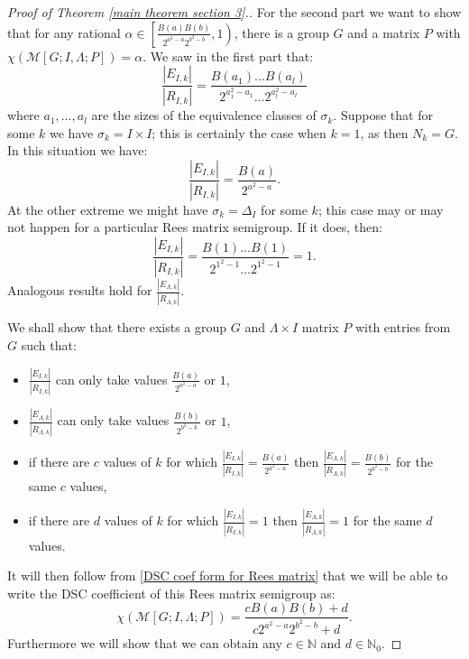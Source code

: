 \documentclass[10pt,a4paper]{amsart}
\newcommand{\N}{\mathbb{N}}
\newcommand{\RM}{\mathcal{M}[G;I,\Lambda;P]}
\begin{document}
\begin{proof}[Proof of Theorem \ref{main theorem section 3}.]
    For the second part we want to show that for any rational $\alpha \in \left[\frac{B(a)B(b)}{2^{a^2 - a}2^{b^2 - b}},1\right)$, there is a group $G$ and a matrix $P$ with $\chi(\RM) = \alpha$. 
    We saw in the first part that:
    \begin{equation*}
        \frac{|E_{I,k}|}{|R_{I,k}|} = \frac{B(a_1)\dots B(a_l)}{2^{a_1^2 - a_1}\dots2^{a_l^2 - a_l}} 
    \end{equation*}
    where $a_1 , \dots , a_l$ are the sizes of the equivalence classes of $\sigma_k$.
    Suppose that for some $k$ we have $\sigma_k = I \times I$; this is certainly the case when $k = 1$, as then $N_k = G$.
    In this situation we have:
    \begin{equation*}
        \frac{|E_{I,k}|}{|R_{I,k}|} = \frac{B(a)}{2^{a^2 - a}}.
    \end{equation*}
    At the other extreme we might have $\sigma_k = \Delta_I$ for some $k$; this case may or may not happen for a particular Rees matrix semigroup.
    If it does, then:
    \begin{equation*}
        \frac{|E_{I,k}|}{|R_{I,k}|}= \frac{B(1) \dots B(1)}{2^{1^2 - 1} \dots 2^{1^2 - 1}} = 1.
    \end{equation*}
    Analogous results hold for $\frac{|E_{\Lambda,k}|}{|R_{\Lambda,k}|}$.
    
    We shall show that there exists a group $G$ and $\Lambda \times I$ matrix $P$ with entries from $G$ such that:
    \begin{itemize}
        \item $ \frac{|E_{I,k}|}{|R_{I,k}|}$ can only take values $\frac{B(a)}{2^{a^2 -a}}$ or $1$,
        \item $\frac{|E_{\Lambda,k}|}{|R_{\Lambda,k}|}$ can only take values $\frac{B(b)}{2^{b^2 -b}}$ or $1$,
        \item if there are $c$ values of $k$ for which $\frac{|E_{I,k}|}{|R_{I,k}|} = \frac{B(a)}{2^{a^2 -a}}$ then $\frac{|E_{\Lambda,k}|}{|R_{\Lambda,k}|} = \frac{B(b)}{2^{b^2 - b}}$ for the same $c$ values,
        \item if there are $d$ values of $k$ for which $\frac{|E_{I,k}|}{|R_{I,k}|} = 1$ then $\frac{|E_{\Lambda,k}|}{|R_{\Lambda,k}|} = 1$ for the same $d$ values.
    \end{itemize}
    It will then follow from \eqref{DSC coef form for Rees matrix} that we will be able to write the DSC coefficient of this Rees matrix semigroup as:
    \begin{equation*}
        \chi (\RM) = \frac{cB(a)B(b) + d}{c 2^{a^2 -a}2^{b^2 - b}+d}.
    \end{equation*}
    Furthermore we will show that we can obtain any $c \in \N$ and $d \in \N_0$.


\end{proof}
\end{document}
